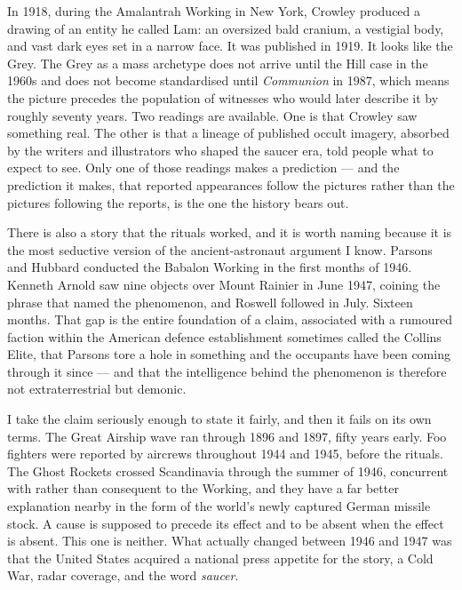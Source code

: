 \begin{funfact}
In 1918, during the Amalantrah Working in New York, Crowley
produced a drawing of an entity he called Lam: an oversized bald cranium, a vestigial body, and
vast dark eyes set in a narrow face. It was published in 1919. It looks like the Grey. The
Grey as a mass archetype does not arrive until the Hill case in the 1960s and does not become
standardised until \emph{Communion} in 1987, which means the picture precedes the population of
witnesses who would later describe it by roughly seventy years. Two readings are available. One
is that Crowley saw something real. The other is that a lineage of published occult imagery,
absorbed by the writers and illustrators who shaped the saucer era, told people what to expect to
see. Only one of those readings makes a prediction --- and the prediction it makes, that reported
appearances follow the pictures rather than the pictures following the reports, is the one the
history bears out.
\end{funfact}

There is also a story that the rituals worked, and it is worth naming because it is the most
seductive version of the ancient-astronaut argument I know. Parsons and Hubbard conducted the
Babalon Working in the first months of 1946. Kenneth Arnold saw nine objects over Mount Rainier
in June 1947, coining the phrase that named the phenomenon, and Roswell followed in July. Sixteen
months. That gap is the entire foundation of a claim, associated with a rumoured faction within
the American defence establishment sometimes called the Collins Elite, that Parsons tore a hole
in something and the occupants have been coming through it since --- and that the intelligence
behind the phenomenon is therefore not extraterrestrial but demonic.

I take the claim seriously enough to state it fairly, and then it fails on its own terms. The
Great Airship wave ran through 1896 and 1897, fifty years early. Foo fighters were reported by
aircrews throughout 1944 and 1945, before the rituals. The Ghost Rockets crossed Scandinavia
through the summer of 1946, concurrent with rather than consequent to the Working, and they have
a far better explanation nearby in the form of the world's newly captured German missile stock.
A cause is supposed to precede its effect and to be absent when the effect is absent. This one is
neither. What actually changed between 1946 and 1947 was that the United States acquired a
national press appetite for the story, a Cold War, radar coverage, and the word
\emph{saucer}.



